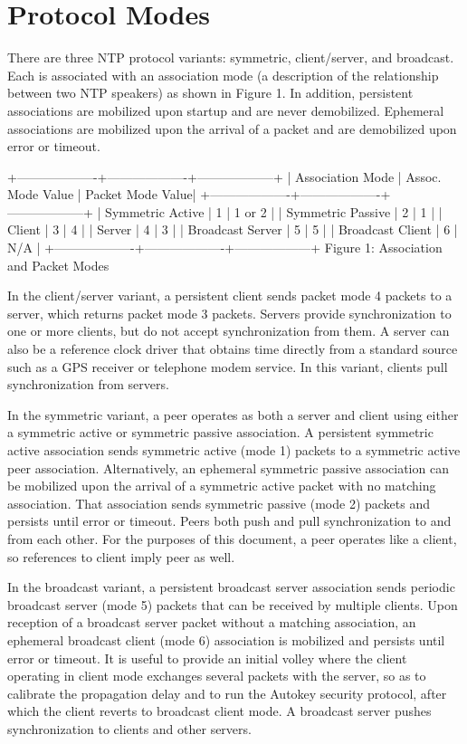 \chapter{Protocol Modes}

There are three NTP protocol variants: symmetric, client/server, and
broadcast. Each is associated with an association mode (a
description of the relationship between two NTP speakers) as shown in
Figure 1. In addition, persistent associations are mobilized upon
startup and are never demobilized. Ephemeral associations are
mobilized upon the arrival of a packet and are demobilized upon error
or timeout.

+-------------------+-------------------+------------------+
| Association Mode | Assoc. Mode Value | Packet Mode Value|
+-------------------+-------------------+------------------+
| Symmetric Active | 1 | 1 or 2 |
| Symmetric Passive | 2 | 1 |
| Client | 3 | 4 |
| Server | 4 | 3 |
| Broadcast Server | 5 | 5 |
| Broadcast Client | 6 | N/A |
+-------------------+-------------------+------------------+
Figure 1: Association and Packet Modes

In the client/server variant, a persistent client sends packet mode 4
packets to a server, which returns packet mode 3 packets. Servers
provide synchronization to one or more clients, but do not accept
synchronization from them. A server can also be a reference clock
driver that obtains time directly from a standard source such as a
GPS receiver or telephone modem service. In this variant, clients
pull synchronization from servers.

In the symmetric variant, a peer operates as both a server and client
using either a symmetric active or symmetric passive association. A
persistent symmetric active association sends symmetric active (mode
1) packets to a symmetric active peer association. Alternatively, an
ephemeral symmetric passive association can be mobilized upon the
arrival of a symmetric active packet with no matching association.
That association sends symmetric passive (mode 2) packets and
persists until error or timeout. Peers both push and pull
synchronization to and from each other. For the purposes of this
document, a peer operates like a client, so references to client
imply peer as well.

In the broadcast variant, a persistent broadcast server association
sends periodic broadcast server (mode 5) packets that can be received
by multiple clients. Upon reception of a broadcast server packet
without a matching association, an ephemeral broadcast client (mode
6) association is mobilized and persists until error or timeout. It
is useful to provide an initial volley where the client operating in
client mode exchanges several packets with the server, so as to
calibrate the propagation delay and to run the Autokey security
protocol, after which the client reverts to broadcast client mode. A
broadcast server pushes synchronization to clients and other servers.

